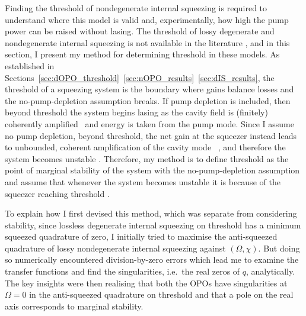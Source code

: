 Finding the threshold of nondegenerate internal squeezing is required to understand where this model is valid and, experimentally, how high the pump power can be raised without lasing.
The threshold of lossy degenerate and nondegenerate internal squeezing is not available in the literature , and in this section, I present my method for determining threshold in these models. %
As established in Sections~\ref{sec:dOPO_threshold}~\ref{sec:nOPO_results}~\ref{sec:dIS_results}, the threshold of a squeezing system is the boundary where gains balance losses and the no-pump-depletion assumption breaks. If pump depletion is included, then beyond threshold the system begins lasing as the cavity field is (finitely) coherently amplified~\cite{} and energy is taken from the pump mode. Since I assume no pump depletion, beyond threshold, the net gain at the squeezer instead leads to unbounded, coherent amplification of the cavity mode~\cite{lasingMaterial} , and therefore the system becomes unstable . Therefore, my method is to define threshold as the point of marginal stability of the system with the no-pump-depletion assumption and assume that whenever the system becomes unstable it is because of the squeezer reaching threshold .

To explain how I first devised this method, which was separate from considering stability, since lossless degenerate internal squeezing on threshold has a minimum squeezed quadrature of zero, I initially tried to maximise the anti-squeezed quadrature of lossy nondegenerate internal squeezing against $(\Omega,\chi)$. But doing so numerically encountered division-by-zero errors which lead me to examine the transfer functions and find the singularities, i.e.\ the real zeros of $q$, analytically. The key insights were then realising that both the OPOs have singularities at $\Omega=0$ in the anti-squeezed quadrature on threshold and that a pole on the real axis corresponds to marginal stability.

